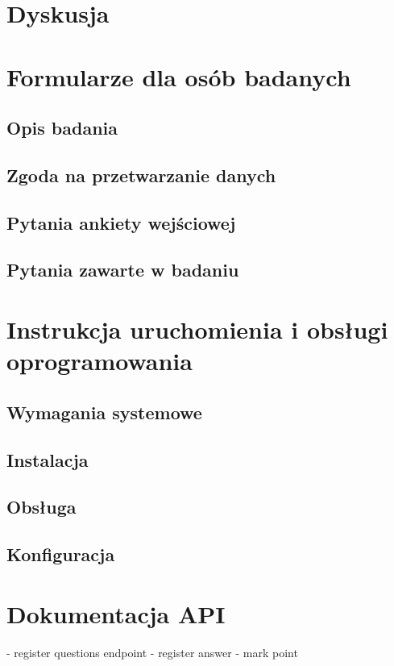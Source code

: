 \documentclass{./assets/wfis}
\begin{document}
\chapter{Dyskusja}\label{dyskusja}

\appendix
\chapter{Formularze dla osób badanych}\label{formularz-dla-osoby-badanej}
\section{Opis badania}\label{opis-badania}
\section{Zgoda na przetwarzanie danych}\label{zgoda-na-przetwarzanie-danych}
\section{Pytania ankiety wejściowej}\label{pytania-ankiety-wejsciowej}
\section{Pytania zawarte w badaniu}\label{pytania-badania}
\chapter{Instrukcja uruchomienia i obsługi oprogramowania}\label{instrukcja}
\section{Wymagania systemowe}
\section{Instalacja}
\section{Obsługa}
\section{Konfiguracja}
\chapter{Dokumentacja API}\label{api}
- register questions endpoint
- register answer
- mark point

\printbibliography

\clearpage
\listoffigures
\clearpage
\listoftables
\clearpage
\end{document}
